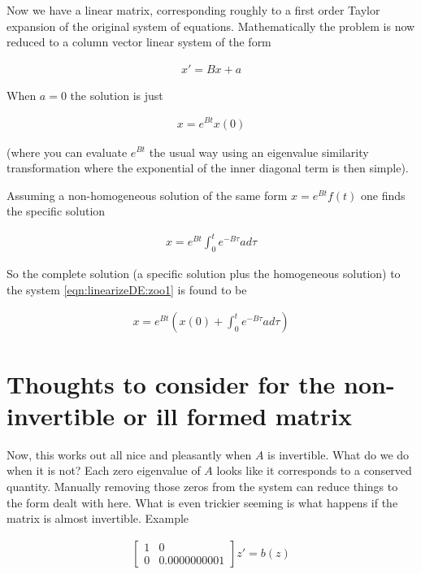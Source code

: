 Now we have a linear matrix, corresponding roughly to a first order Taylor expansion of the original system of equations.  Mathematically the problem is now reduced to a column vector linear system of the form

\begin{align}\label{eqn:linearizeDE:zoo1}
x' = B x + a
\end{align}

When $a = 0$ the solution is just

\begin{align}\label{eqn:linearizeDE:zoo2}
x = e^{B t} x(0)
\end{align}

(where you can evaluate $e^{Bt}$ the usual way using an eigenvalue similarity transformation where the exponential of the inner diagonal term is then simple).

Assuming a non-homogeneous solution of the same form $x = e^{B t} f(t)$ one finds the specific solution 

\begin{align}\label{eqn:linearizeDE:zoo3}
x = e^{B t} \int_0^t e^{-B\tau} a d\tau
\end{align}

So the complete solution (a specific solution plus the homogeneous solution) to the system \ref{eqn:linearizeDE:zoo1} is found to be

\begin{align}\label{eqn:linearizeDE:zoo4}
x = e^{B t} \left( x(0) + \int_0^t e^{-B\tau} a d\tau \right)
\end{align}

\section{Thoughts to consider for the non-invertible or ill formed matrix}

Now, this works out all nice and pleasantly when $A$ is invertible.  What do we do when it is not?  Each zero eigenvalue of $A$ looks like it corresponds to a conserved quantity.  Manually removing those zeros from the system can reduce things to the form dealt with here.  What is even trickier seeming is what happens if the matrix is almost invertible.  Example

\begin{align}\label{eqn:linearizeDE:zoo5}
\begin{bmatrix}
1 & 0 \\
0 & 0.0000000001
\end{bmatrix} z' = b(z)
\end{align}

